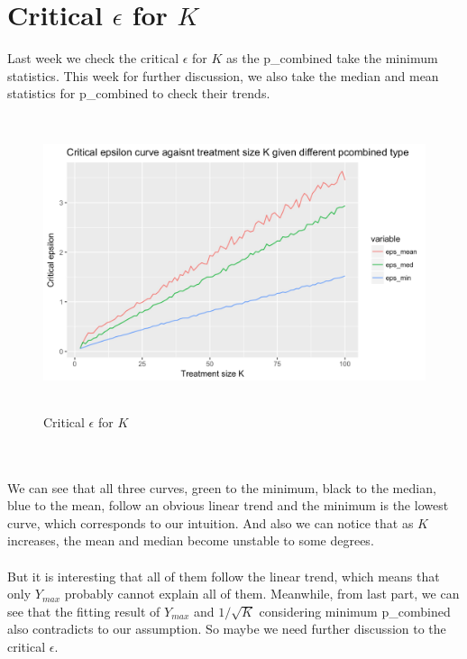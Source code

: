 \documentclass[10pt,english]{article}\usepackage{graphicx, color}
\numberwithin{equation}{section}
\numberwithin{figure}{section}
\begin{document}
\section{Critical $\epsilon$ for $K$}
Last week we check the critical $\epsilon$ for $K$ as the p\_combined take the minimum statistics. This week for further discussion, we also take the median and mean statistics for p\_combined to check their trends.\\
\begin{figure}[htbp]
\centering\includegraphics[width=5in, height=3.4in]{cr}
\caption{Critical $\epsilon$ for $K$}
\end{figure}
\quad\\
\quad\\
We can see that all three curves, green to the minimum, black to the median, blue to the mean, follow an obvious linear trend and the minimum is the lowest curve, which corresponds to our intuition. And also we can notice that as $K$ increases, the mean and median become unstable to some degrees.\\
\quad\\
But it is interesting that all of them follow the linear trend, which means that only $Y_{max}$ probably cannot explain all of them. Meanwhile, from last part, we can see that the fitting result of $Y_{max}$ and $1/\sqrt{K}$ considering minimum p\_combined also contradicts to our assumption. So maybe we need further discussion to the critical $\epsilon$.
\end{document}

